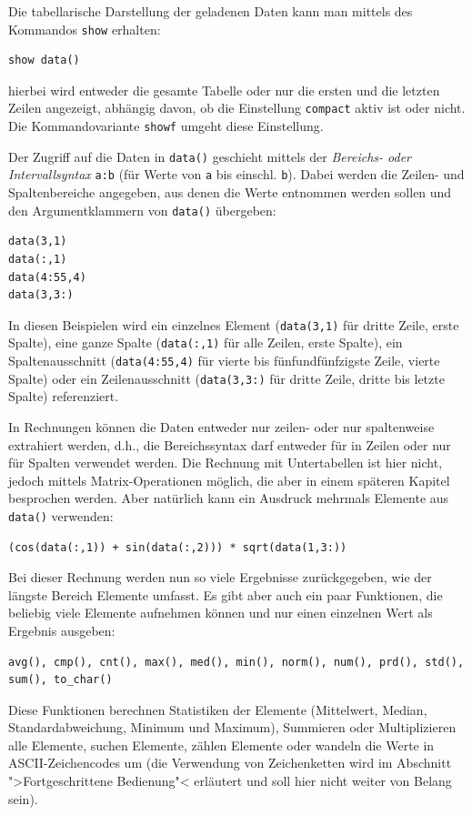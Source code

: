 \documentclass[DIV=14,headsepline,footsepline]{scrbook}
\begin{document}
				Die tabellarische Darstellung der geladenen Daten kann man mittels des Kommandos \verb+show+ erhalten:
				\begin{lstlisting}
show data()
				\end{lstlisting}
				hierbei wird entweder die gesamte Tabelle oder nur die ersten und die letzten Zeilen angezeigt, abhängig davon, ob die Einstellung \verb+compact+ aktiv ist oder nicht. Die Kommandovariante \verb+showf+ umgeht diese Einstellung.
				
				Der Zugriff auf die Daten in \verb+data()+ geschieht mittels der \emph{Bereichs- oder Intervallsyntax} \verb+a:b+ (für Werte von \verb+a+ bis einschl. \verb+b+). Dabei werden die Zeilen- und Spaltenbereiche angegeben, aus denen die Werte entnommen werden sollen und den Argumentklammern von \verb+data()+ übergeben:
				\begin{lstlisting}
data(3,1)
data(:,1)
data(4:55,4)
data(3,3:)
				\end{lstlisting}
				In diesen Beispielen wird ein einzelnes Element (\verb+data(3,1)+ für dritte Zeile, erste Spalte), eine ganze Spalte (\verb+data(:,1)+ für alle Zeilen, erste Spalte), ein Spaltenausschnitt (\verb+data(4:55,4)+ für vierte bis fünfundfünfzigste Zeile, vierte Spalte) oder ein Zeilenausschnitt (\verb+data(3,3:)+ für dritte Zeile, dritte bis letzte Spalte) referenziert.
				
				In Rechnungen können die Daten entweder nur zeilen- oder nur spaltenweise extrahiert werden, d.h., die Bereichssyntax darf entweder für in Zeilen oder nur für Spalten verwendet werden. Die Rechnung mit Untertabellen ist hier nicht, jedoch mittels Matrix-Operationen möglich, die aber in einem späteren Kapitel besprochen werden. Aber natürlich kann ein Ausdruck mehrmals Elemente aus \verb+data()+ verwenden:
				\begin{lstlisting}
(cos(data(:,1)) + sin(data(:,2))) * sqrt(data(1,3:))
				\end{lstlisting}
				Bei dieser Rechnung werden nun so viele Ergebnisse zurückgegeben, wie der längste Bereich Elemente umfasst. Es gibt aber auch ein paar Funktionen, die beliebig viele Elemente aufnehmen können und nur einen einzelnen Wert als Ergebnis ausgeben:
				\begin{lstlisting}
avg(), cmp(), cnt(), max(), med(), min(), norm(), num(), prd(), std(), sum(), to_char()
				\end{lstlisting}
				Diese Funktionen berechnen Statistiken der Elemente (Mittelwert, Median, Standardabweichung, Minimum und Maximum), Summieren oder Multiplizieren alle Elemente, suchen Elemente, zählen Elemente oder wandeln die Werte in ASCII-Zeichencodes um (die Verwendung von Zeichenketten wird im Abschnitt ">Fortgeschrittene Bedienung"< erläutert und soll hier nicht weiter von Belang sein).
				
\end{document}
